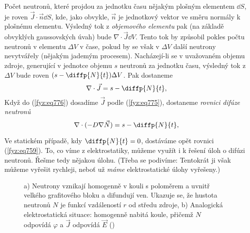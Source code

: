     Počet neutronů, které projdou za jednotku času nějakým plošným elementem \(\dd{S}\), je roven
    \(\vec{J}\cdot\vec{n}\dd{S}\), kde, jako obvykle, \(\vec{n}\) je jednotkový vektor ve směru
    normály k plošnému elementu. Výsledný tok z \emph{objemového elementu} pak (na základě obvyklých
    gaussovských úvah) bude \(\nabla\cdot\vec{J}\dd{V}\). Tento tok by způsobil pokles počtu
    neutronů v elementu \(\Delta V\) v čase, pokud by se však v \(\Delta V\) další neutrony
    nevytvářely (nějakým jademým procesem). Nacházejí-li se v uvažovaném objemu zdroje, generující v
    jednotce objemu \(s\) neutronů za jednotku času, výsledný tok z \(\Delta V\) bude roven \((s -
    \diffp{N}{t})\Delta V\). Pak dostaneme
    \begin{equation}\label{fyz:eq776}
      \nabla\cdot\vec{J}= s - \diffp{N}{t},
    \end{equation} 
    Když do (\ref{fyz:eq776}) dosadíme \(\vec{J}\) podle (\ref{fyz:eq775}), dostaneme \emph{rovnici
    difúze neutronů}
    \begin{equation}\label{fyz:eq777}
      \nabla\cdot(-D\nabla\vec{N})= s - \diffp{N}{t},
    \end{equation} 

    Ve statickém případě, kdy \(\diffp{N}{t} = 0\), dostáváme opět rovnici (\ref{fyz:eq759}). To, co
    víme z elektrostati­ky, můžeme využít i k řešení úloh o difúzi neutronů. Řešme tedy nějakou
    úlohu. (Třeba se podivíme:  Tentokrát ji však můžeme vyřešit rychleji, neboť už \emph{máme} elektrostatické
    úlohy vyřešeny.)

    \begin{figure}[ht!]
      \centering
                     \newline
      \label{fyz:fig730}
      \caption{a) Neutrony vznikají homogenně v kouli s poloměrem a uvnitř velkého grafitového bloku
        a difundují ven. Ukazuje se, že hustota neutronů \(N\) je funkcí vzdáleností \(r\) od středu
        zdroje, b) Analogická elektrostatická situace: homogenně nabitá koule, přičemž \(N\)
        odpovídá \(\varphi\) a \(\vec{J}\) odpovídá \(\vec{E}\) (\cite[s.~215]{Feynman02})}
    \end{figure}

